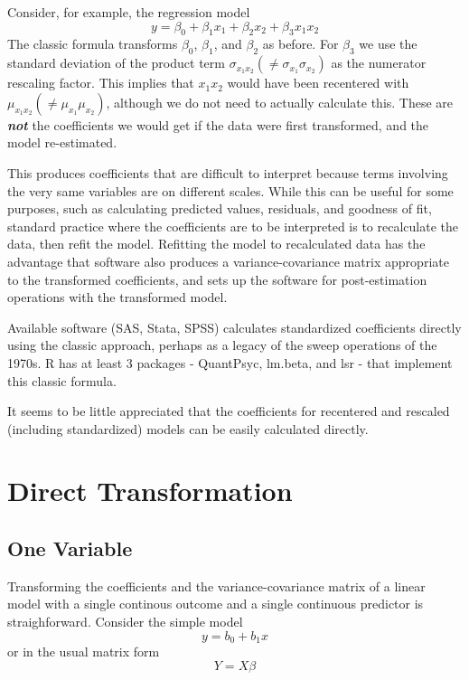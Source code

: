 \documentclass[]{article}
\begin{document}
Consider, for example, the regression model
\[y = \beta_0 + \beta_1x_1 + \beta_2x_2+ \beta_3x_1x_2\] The classic
formula transforms \(\beta_0\), \(\beta_1\), and \(\beta_2\) as before.
For \(\beta_3\) we use the standard deviation of the product term
\(\sigma_{x_1x_2} (\neq \sigma_{x_1}\sigma_{x_2})\) as the numerator
rescaling factor. This implies that \(x_1x_2\) would have been
recentered with \(\mu_{x_1x_2}(\neq \mu_{x_1}\mu_{x_2})\), although we
do not need to actually calculate this. These are \textbf{\emph{not}}
the coefficients we would get if the data were first transformed, and
the model re-estimated.

This produces coefficients that are difficult to interpret because terms
involving the very same variables are on different scales. While this
can be useful for some purposes, such as calculating predicted values,
residuals, and goodness of fit, standard practice where the coefficients
are to be interpreted is to recalculate the data, then refit the model.
Refitting the model to recalculated data has the advantage that software
also produces a variance-covariance matrix appropriate to the
transformed coefficients, and sets up the software for post-estimation
operations with the transformed model.

Available software (SAS, Stata, SPSS) calculates standardized
coefficients directly using the classic approach, perhaps as a legacy of
the sweep operations of the 1970s. R has at least 3 packages -
QuantPsyc, lm.beta, and lsr - that implement this classic formula.

It seems to be little appreciated that the coefficients for recentered
and rescaled (including standardized) models can be easily calculated
directly.

\hypertarget{direct-transformation}{%
\section{Direct Transformation}\label{direct-transformation}}

\hypertarget{one-variable}{%
\subsection{One Variable}\label{one-variable}}

Transforming the coefficients and the variance-covariance matrix of a
linear model with a single continous outcome and a single continuous
predictor is straighforward. Consider the simple model
\[y = b_0 + b_1x\] or in the usual matrix form \[Y=X\beta\]
\end{document}
